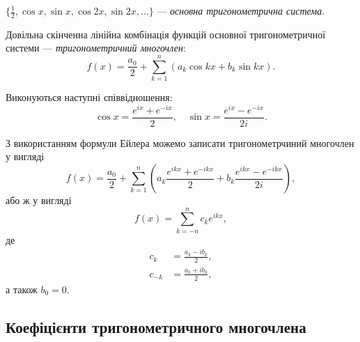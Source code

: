 \begin{definition}
    $\{\frac{1}{2}, \cos x, \sin x, \cos 2x, \sin 2x, \ldots\}$ --- \textit{основна тригонометрична система}.
\end{definition}

\begin{definition}
    Довільна скінченна лінійна комбінація функцій основної тригонометричної системи --- \textit{тригонометричний многочлен}:
    \begin{equation}
        f(x) = \frac{a_0}{2} + \sum_{k = 1}^n (a_k \cos k x + b_k \sin k x).
    \end{equation}
\end{definition}

\begin{th_formula}[Ейлера]
    Виконуються наступні співвідношення:
    \begin{equation}
        \cos x = \frac{e^{ix} + e^{-ix}}{2}, \quad \sin x = \frac{e^{ix} - e^{-ix}}{2 i}.
    \end{equation}
\end{th_formula}

З використанням формули Ейлера можемо записати тригонометрчиний многочлен у вигляді
\begin{equation}
    f(x) = \frac{a_0}{2} + \sum_{k = 1}^n \left( a_k \frac{e^{ikx} + e^{-ikx}}{2} + b_k \frac{e^{ikx} - e^{-ikx}}{2 i} \right),
\end{equation}
або ж у вигляді
\begin{equation}
    \label{eq:1.1.9}
    f(x) = \sum_{k = -n}^n c_k e^{ikx},
\end{equation}
де
\begin{align}
    \label{eq:1.1.10}
    c_k &= \frac{a_k - i b_k}{2}, \\
    \label{eq:1.1.11}
    c_{-k} &= \frac{a_k + i b_k}{2},
\end{align}
а також $b_0 = 0$.

\subsection{Коефіцієнти тригонометричного многочлена}

